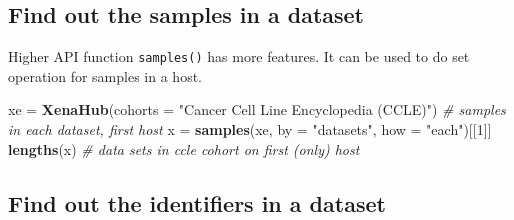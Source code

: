 \documentclass[nofonts,]{tufte-handout}
\newenvironment{Shaded}{\begin{snugshade}}{\end{snugshade}}
\newcommand{\CommentTok}[1]{\textcolor[rgb]{0.56,0.35,0.01}{\textit{#1}}}
\newcommand{\DataTypeTok}[1]{\textcolor[rgb]{0.13,0.29,0.53}{#1}}
\newcommand{\DecValTok}[1]{\textcolor[rgb]{0.00,0.00,0.81}{#1}}
\newcommand{\KeywordTok}[1]{\textcolor[rgb]{0.13,0.29,0.53}{\textbf{#1}}}
\newcommand{\NormalTok}[1]{#1}
\newcommand{\OperatorTok}[1]{\textcolor[rgb]{0.81,0.36,0.00}{\textbf{#1}}}
\newcommand{\OtherTok}[1]{\textcolor[rgb]{0.56,0.35,0.01}{#1}}
\newcommand{\StringTok}[1]{\textcolor[rgb]{0.31,0.60,0.02}{#1}}
\begin{document}
\hypertarget{find-out-the-samples-in-a-dataset}{%
\subsection{Find out the samples in a
dataset}\label{find-out-the-samples-in-a-dataset}}

\begin{Shaded}
\end{Shaded}

Higher API function \texttt{samples()} has more features. It can be used
to do set operation for samples in a host.

\begin{Shaded}
\begin{Highlighting}[]
\NormalTok{xe =}\StringTok{ }\KeywordTok{XenaHub}\NormalTok{(}\DataTypeTok{cohorts =} \StringTok{"Cancer Cell Line Encyclopedia (CCLE)"}\NormalTok{)}
\CommentTok{# samples in each dataset, first host}
\NormalTok{x =}\StringTok{ }\KeywordTok{samples}\NormalTok{(xe, }\DataTypeTok{by =} \StringTok{"datasets"}\NormalTok{, }\DataTypeTok{how =} \StringTok{"each"}\NormalTok{)[[}\DecValTok{1}\NormalTok{]]}
\KeywordTok{lengths}\NormalTok{(x)  }\CommentTok{# data sets in ccle cohort on first (only) host}
\end{Highlighting}
\end{Shaded}

\hypertarget{find-out-the-identifiers-in-a-dataset}{%
\subsection{Find out the identifiers in a
dataset}\label{find-out-the-identifiers-in-a-dataset}}
\end{document}
